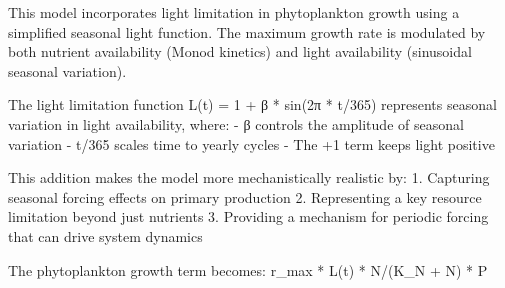 This model incorporates light limitation in phytoplankton growth using a simplified seasonal light function. The maximum growth rate is modulated by both nutrient availability (Monod kinetics) and light availability (sinusoidal seasonal variation).

The light limitation function L(t) = 1 + β * sin(2π * t/365) represents seasonal variation in light availability, where:
- β controls the amplitude of seasonal variation
- t/365 scales time to yearly cycles
- The +1 term keeps light positive

This addition makes the model more mechanistically realistic by:
1. Capturing seasonal forcing effects on primary production
2. Representing a key resource limitation beyond just nutrients
3. Providing a mechanism for periodic forcing that can drive system dynamics

The phytoplankton growth term becomes: r_max * L(t) * N/(K_N + N) * P
